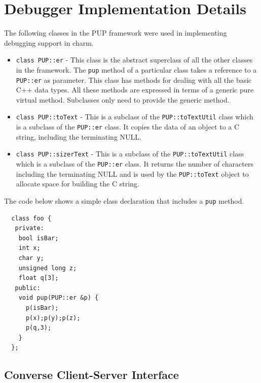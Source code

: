 \documentclass[10pt]{article}
\begin{document}
\section{Debugger Implementation Details}

The following classes in the PUP framework were used in
implementing debugging support in charm.


\begin{itemize}

\item

\texttt{class PUP::er} - This class is the abstract superclass of
all the other classes in the framework. The \texttt{pup} method of
a particular class takes a reference to a \texttt{PUP::er} as
parameter. This class has methods for dealing with all the basic
C++ data types. All these methods are expressed in terms of a
generic pure virtual method. Subclasses only need to provide the
generic method.

\item

\texttt{class PUP::toText} - This is a subclass of the
\texttt{PUP::toTextUtil} class which is a subclass of the
\texttt{PUP::er} class. It copies the data of an object to a C
string, including the terminating NULL.

\item

\texttt{class PUP::sizerText} - This is a subclass of the
\texttt{PUP::toTextUtil} class which is a subclass of the
\texttt{PUP::er} class. It returns the number of characters
including the terminating NULL and is used by the
\texttt{PUP::toText} object to allocate space for building the C
string.

\end{itemize}


The code below shows a simple class declaration
that includes a \texttt{pup} method.


\begin{verbatim}
  class foo {
   private:
    bool isBar;
    int x;
    char y;
    unsigned long z;
    float q[3];
   public:
    void pup(PUP::er &p) {
      p(isBar);
      p(x);p(y);p(z);
      p(q,3);
    }
  };
\end{verbatim}


\subsection{Converse Client-Server Interface}
\end{document}
